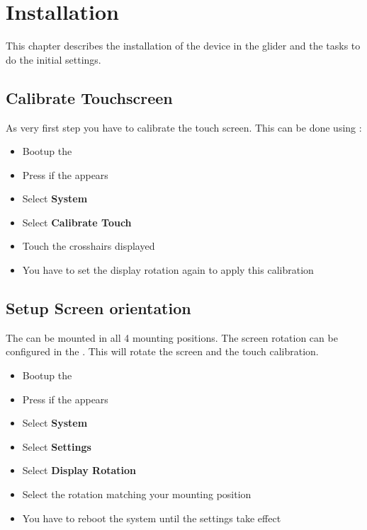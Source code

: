 \chapter{Installation}\label{cha:installation}

This chapter describes the installation of the device in the glider and the tasks to do the initial settings.

\section{Calibrate Touchscreen}\label{cha:cal_touch}
As very first step you have to calibrate the touch screen.
This can be done using \ovmenu:

\begin{itemize}
	\item Bootup the \ovfc
	\item Press  if the \ovmenu appears
	\item Select \textbf{System}
	\item Select \textbf{Calibrate Touch}
	\item Touch the crosshairs displayed
	\item You have to set the display rotation again to apply this calibration
\end{itemize}	

\section{Setup Screen orientation}\label{cha:setup_scr_or}
The \ovfc can be mounted in all 4 mounting positions.
The screen rotation can be configured in the \ovmenu.
This will rotate the screen and the touch calibration.
\begin{itemize}
 	\item Bootup the \ovfc
 	\item Press  if the \ovmenu appears
 	\item Select \textbf{System}
 	\item Select \textbf{Settings}
 	\item Select \textbf{Display Rotation}
 	\item Select the rotation matching your mounting position
 	\item You have to reboot the system until the settings take effect
\end{itemize}	

